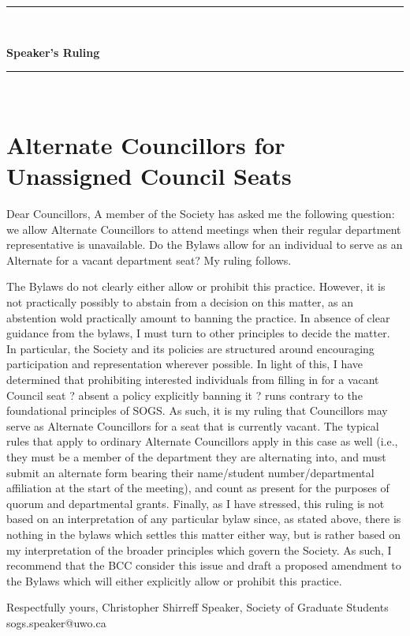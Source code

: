 \setcounter{section}{0}

\begin{center}
\rule{\textwidth}{3.6pt}\\[\baselineskip] %
\begin{Huge}
\textbf{Speaker's Ruling}
\end{Huge}

\rule{\textwidth}{3.6pt}\\[\baselineskip] %



\vspace*{2\baselineskip} %
\end{center}
\section*{Alternate Councillors for Unassigned Council Seats}


Dear Councillors,
	A member of the Society has asked me the following question: we allow Alternate Councillors to attend meetings when their regular department representative is unavailable. Do the Bylaws allow for an individual to serve as an Alternate for a vacant department seat? My ruling follows.
	
\begin{multicols}{2}
	The Bylaws do not clearly either allow or prohibit this practice. However, it is not practically possibly to abstain from a decision on this matter, as an abstention wold practically amount to banning the practice. In absence of clear guidance from the bylaws, I must turn to other principles to decide the matter. In particular, the Society and its policies are structured around encouraging participation and representation wherever possible. In light of this, I have determined that prohibiting interested individuals from filling in for a vacant Council seat ? absent a policy explicitly banning it ? runs contrary to the foundational principles of SOGS.
	As such, it is my ruling that Councillors may serve as Alternate Councillors for a seat that is currently vacant. The typical rules that apply to ordinary Alternate Councillors apply in this case as well (i.e., they must be a member of the department they are alternating into, and must submit an alternate form bearing their name/student number/departmental affiliation at the start of the meeting), and count as present for the purposes of quorum and departmental grants.
	Finally, as I have stressed, this ruling is not based on an interpretation of any particular bylaw since, as stated above, there is nothing in the bylaws which settles this matter either way, but is rather based on my interpretation of the broader principles which govern the Society. As such, I recommend that the BCC consider this issue and draft a proposed amendment to the Bylaws which will either explicitly allow or prohibit this practice.
\end{multicols}




\noindent
Respectfully yours, \newline
\noindent
Christopher Shirreff \newline
\indent
Speaker, \newline 
\indent
Society of Graduate Students \newline
\indent
sogs.speaker@uwo.ca \newline

